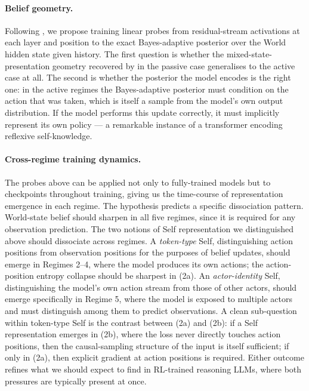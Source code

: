 \documentclass[11pt]{article}
\begin{document}
\paragraph{Belief geometry.} Following \citet{shai2024belief}, we propose training linear probes from residual-stream activations at each layer and position to the exact Bayes-adaptive posterior over the World hidden state given history. The first question is whether the mixed-state-presentation geometry recovered by \citet{shai2024belief} in the passive case generalises to the active case at all. The second is whether the posterior the model encodes is the right one: in the active regimes the Bayes-adaptive posterior must condition on the action that was taken, which is itself a sample from the model's own output distribution. If the model performs this update correctly, it must implicitly represent its own policy --- a remarkable instance of a transformer encoding reflexive self-knowledge.

\paragraph{Cross-regime training dynamics.} The probes above can be applied not only to fully-trained models but to checkpoints throughout training, giving us the time-course of representation emergence in each regime. The hypothesis predicts a specific dissociation pattern. World-state belief should sharpen in all five regimes, since it is required for any observation prediction. The two notions of Self representation we distinguished above should dissociate across regimes. A \emph{token-type} Self, distinguishing action positions from observation positions for the purposes of belief updates, should emerge in Regimes 2--4, where the model produces its own actions; the action-position entropy collapse should be sharpest in (2a). An \emph{actor-identity} Self, distinguishing the model's own action stream from those of other actors, should emerge specifically in Regime 5, where the model is exposed to multiple actors and must distinguish among them to predict observations. A clean sub-question within token-type Self is the contrast between (2a) and (2b): if a Self representation emerges in (2b), where the loss never directly touches action positions, then the causal-sampling structure of the input is itself sufficient; if only in (2a), then explicit gradient at action positions is required. Either outcome refines what we should expect to find in RL-trained reasoning LLMs, where both pressures are typically present at once.
\end{document}
